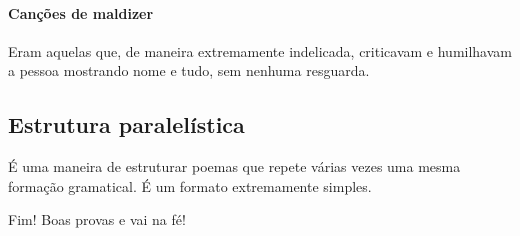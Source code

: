 \documentclass{article}
\begin{document}
\paragraph{Canções de maldizer} 
Eram aquelas que, de maneira extremamente indelicada, criticavam e humilhavam a pessoa mostrando nome e tudo, sem nenhuma resguarda.

\subsection{Estrutura paralelística}\label{eparalelistica}
É uma maneira de estruturar poemas que repete várias vezes uma mesma formação gramatical. É um formato extremamente simples.

Fim!
Boas provas e vai na fé!
\end{document}
